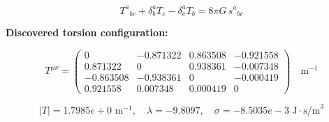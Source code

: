 
\begin{equation}
  T^a{}_{bc} + \delta^a_b T_c - \delta^a_c T_b = 8\pi G \, s^a{}_{bc}
\end{equation}

\textbf{Discovered torsion configuration:}

\begin{equation}
  T^{\mu\nu} = \begin{pmatrix}
    0 & -0.871322 & 0.863508 & -0.921558 \\
    0.871322 & 0 & 0.938361 & -0.007348 \\
    -0.863508 & -0.938361 & 0 & -0.000419 \\
    0.921558 & 0.007348 & 0.000419 & 0
  \end{pmatrix} \quad \text{m}^{-1}
\end{equation}

\begin{equation}
  |T| = 1.7985e+0 \text{ m}^{-1}, \quad
  \lambda = -9.8097, \quad
  \sigma = -8.5035e-3 \text{ J}\cdot\text{s/m}^3
\end{equation}